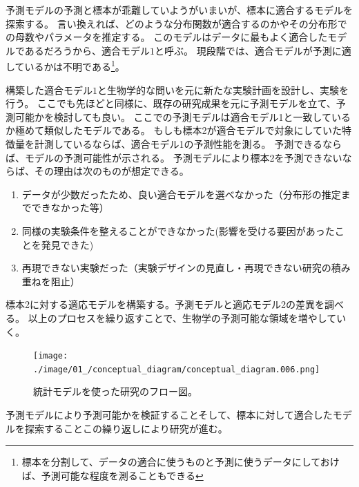 予測モデルの予測と標本が乖離していようがいまいが、標本に適合するモデルを探索する。
言い換えれば、どのような分布関数が適合するのかやその分布形での母数やパラメータを推定する。
このモデルはデータに最もよく適合したモデルであるだろうから、適合モデル$1$と呼ぶ。
現段階では、適合モデルが予測に適しているかは不明である\footnote{標本を分割して、データの適合に使うものと予測に使うデータにしておけば、予測可能な程度を測ることもできる}。

構築した適合モデル$1$と生物学的な問いを元に新たな実験計画を設計し、実験を行う。
ここでも先ほどと同様に、既存の研究成果を元に予測モデルを立て、予測可能かを検討しても良い。
ここでの予測モデルは適合モデル1と一致しているか極めて類似したモデルである。
もしも標本2が適合モデルで対象にしていた特徴量を計測しているならば、適合モデル1の予測性能を測る。
予測できるならば、モデルの予測可能性が示される。
予測モデルにより標本2を予測できないならば、その理由は次のものが想定できる。
\begin{enumerate}
 \item データが少数だったため、良い適合モデルを選べなかった（分布形の推定までできなかった等）
 \item 同様の実験条件を整えることができなかった(影響を受ける要因があったことを発見できた)
 \item 再現できない実験だった（実験デザインの見直し・再現できない研究の積み重ねを阻止）
\end{enumerate}

標本2に対する適応モデルを構築する。予測モデルと適応モデル2の差異を調べる。
以上のプロセスを繰り返すことで、生物学の予測可能な領域を増やしていく。

\begin{figure}
 \begin{center}
  \texttt{[image: ./image/01\_/conceptual\_diagram/conceptual\_diagram.006.png]}
  \caption{統計モデルを使った研究のフロー図。}
  \label{fig:conceptual_diagram_statistics_research}
 \end{center}
\end{figure}

予測モデルにより予測可能かを検証することそして、標本に対して適合したモデルを探索することこの繰り返しにより研究が進む。


